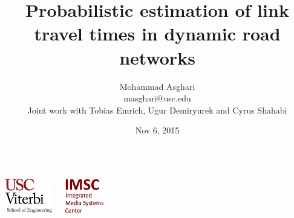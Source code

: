 \documentclass[t]{beamer}
\begin{document}
\graphicspath{ {../Manuscript/figures/}{Graphics/} }

\title[USC Viterbi School of Engineering]{Probabilistic estimation of link travel times in dynamic road networks}  
\author[Mohammad Asghari]{Mohammad Asghari\\ \small{masghari@usc.edu}\\ \vspace{0.1in} \tiny{Joint work with Tobias Emrich, Ugur Demiryurek and Cyrus Shahabi}}

\date{Nov 6, 2015} 

\begin{frame}
\titlepage
\begin{columns}
  \begin{center}
    \includegraphics[height=1.5cm]{viterbi_logo.jpg}
  \end{center}
  \begin{center}
    \includegraphics[height=1.5cm]{imsc_logo.jpg}   
  \end{center}
\end{columns} 
\end{frame}
\end{document}

